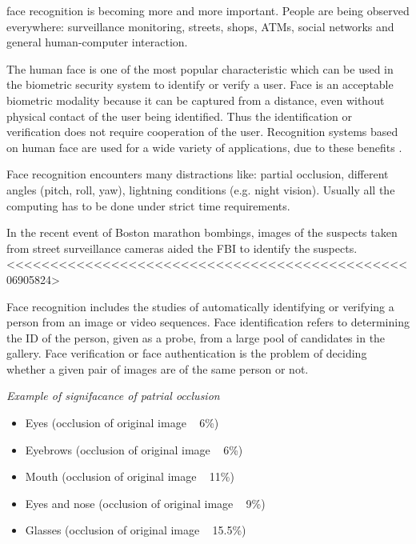 % 
% 
% 
% 

 face recognition is becoming more and more important. People are being observed everywhere: surveillance monitoring, streets, shops, ATMs, social networks and general human-computer interaction. \cite{Forensics}

The human face is one of the most popular
characteristic which can be used in the biometric security system
to identify or verify a user. Face is an acceptable biometric
modality because it can be captured from a distance, even
without physical contact of the user being identified. Thus the
identification or verification does not require cooperation of the
user. Recognition systems based on human face are used for a
wide variety of applications, due to these benefits \cite{Occlusion&noise}.

Face recognition encounters many distractions like: partial occlusion, different angles (pitch, roll, yaw), lightning conditions (e.g. night vision). Usually all the computing has to be done under strict time requirements.

In the recent event of Boston marathon bombings,
images of the suspects taken from street surveillance cameras
aided the FBI to identify the suspects.
<<<<<<<<<<<<<<<<<<<<<<<<<<<<<<<<<<<<<<<<<<<<<<06905824>%

Face recognition includes the studies of automatically
identifying or verifying a person from an image or video
sequences. Face identification refers to determining the ID of
the person, given as a probe, from a large pool of candidates
in the gallery. Face verification or face authentication is the problem of deciding whether a given pair of images are
of the same person or not\cite{Forensics}.


\emph{Example of signifacance of patrial occlusion}
\begin{itemize}
	\item Eyes (occlusion of original image ~ 6\%)
	\item Eyebrows (occlusion of original image ~ 6\%)
	\item Mouth (occlusion of original image ~ 11\%)
	\item Eyes and nose (occlusion of original image ~ 9\%)
	\item Glasses (occlusion of original image ~ 15.5\%)
\end{itemize} 

